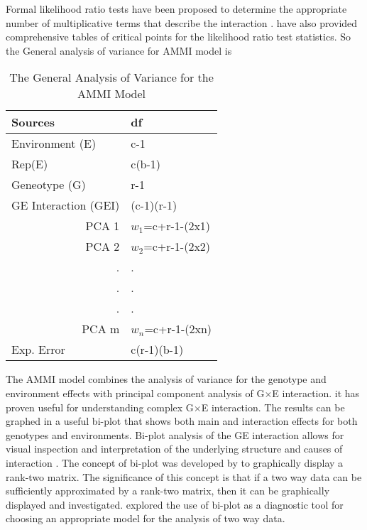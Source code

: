 Formal likelihood ratio tests have been proposed to determine the appropriate number of multiplicative terms  that describe the interaction \citep{Hegemann1976}. \citet{Milliken1989} have also provided comprehensive tables of critical points for the likelihood ratio test statistics. So the General analysis of variance for AMMI model is
\begin{table}[h!]
	\caption{The General Analysis of Variance for the AMMI Model} 
	\centering 
	\begin{tabular}{l l }
		\hline\hline 
		Sources                & df \\ [0.5ex] 
		\hline
		Environment  (E)          & c-1 \\
		Rep(E)               & c(b-1) \\
		Geneotype      (G)        & r-1   \\
		GE Interaction (GEI)        & (c-1)(r-1) \\ 
\multicolumn{1}{r}{	PCA 1}     &  $w_1$=c+r-1-(2x1) \\
\multicolumn{1}{r}{	PCA 2}     & $w_2$=c+r-1-(2x2) \\
\multicolumn{1}{r}{.}		   & . \\
\multicolumn{1}{r}{.}          & . \\
\multicolumn{1}{r}{.}          & . \\
\multicolumn{1}{r}{PCA m}      & $w_n$=c+r-1-(2xn) \\
		  
		Exp. Error             & c(r-1)(b-1) \\ [1ex]
		\hline 
	\end{tabular}
	\label{Table:3.3 }
\end{table}
 The AMMI model combines the analysis of variance for the genotype and environment effects with principal component analysis of G$\times$E interaction. it has proven useful for understanding complex G$\times$E interaction. The results can be graphed in a useful bi-plot that shows both main and interaction effects for both genotypes and environments. Bi-plot analysis  of the GE interaction allows for visual inspection and interpretation of the underlying structure and causes of interaction \citep{Zobel1988,Bradu1978}. The concept of bi-plot was developed by \citet{GABRIEL1971} to graphically display a rank-two matrix. The significance of this concept is that if a two way data can be sufficiently approximated by a rank-two matrix, then it can be graphically displayed and investigated. \citet{Bradu1978} explored the use of bi-plot as a diagnostic tool for choosing an appropriate model for the analysis of two way data.
